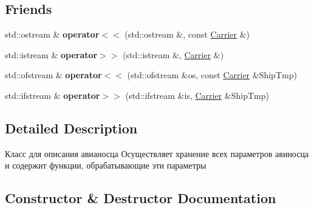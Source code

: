 \subsection*{Friends}
\begin{DoxyCompactItemize}
\item 
\mbox{\label{class_aircraft_carrier_group_1_1_carrier_a1256a8df3c81a3c4660dee2cea8b647a}} 
std\+::ostream \& {\bfseries operator$<$$<$} (std\+::ostream \&, const \mbox{\hyperlink{class_aircraft_carrier_group_1_1_carrier}{Carrier}} \&)
\item 
\mbox{\label{class_aircraft_carrier_group_1_1_carrier_a6b96a414ec4c3b03dd6994465a4a1b97}} 
std\+::istream \& {\bfseries operator$>$$>$} (std\+::istream \&, \mbox{\hyperlink{class_aircraft_carrier_group_1_1_carrier}{Carrier}} \&)
\item 
\mbox{\label{class_aircraft_carrier_group_1_1_carrier_a6814d89937fdc74abb545c18ec5232e1}} 
std\+::ofstream \& {\bfseries operator$<$$<$} (std\+::ofstream \&os, const \mbox{\hyperlink{class_aircraft_carrier_group_1_1_carrier}{Carrier}} \&Ship\+Tmp)
\item 
\mbox{\label{class_aircraft_carrier_group_1_1_carrier_aa3f27f0e4e7e88bf71fad540abc49871}} 
std\+::ifstream \& {\bfseries operator$>$$>$} (std\+::ifstream \&is, \mbox{\hyperlink{class_aircraft_carrier_group_1_1_carrier}{Carrier}} \&Ship\+Tmp)
\end{DoxyCompactItemize}


\subsection{Detailed Description}
Класс для описания авианосца  Осуществляет хранение всех параметров авиносца и содержит функции, обрабатывающие эти параметры 

\subsection{Constructor \& Destructor Documentation}
\mbox{\label{class_aircraft_carrier_group_1_1_carrier_a014facb4517f7f73f860d812099619e1}} 
